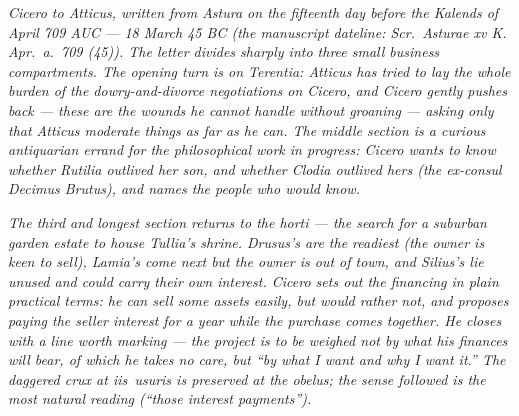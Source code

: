 
\textit{Cicero to Atticus, written from Astura on the
fifteenth day before the Kalends of April 709 AUC ---
18 March 45 BC (the manuscript dateline: \textit{Scr.\
Asturae xv K. Apr.\ a.\ 709 (45)}). The letter divides
sharply into three small business compartments. The
opening turn is on Terentia: Atticus has tried to lay
the whole burden of the dowry-and-divorce negotiations
on Cicero, and Cicero gently pushes back --- these
are the wounds he cannot handle without groaning ---
asking only that Atticus moderate things as far as he
can. The middle section is a curious antiquarian
errand for the philosophical work in progress: Cicero
wants to know whether Rutilia outlived her son, and
whether Clodia outlived hers (the ex-consul Decimus
Brutus), and names the people who would know.}

\textit{The third and longest section returns to the
\textit{horti} --- the search for a suburban garden
estate to house Tullia's shrine. Drusus's are the
readiest (the owner is keen to sell), Lamia's come
next but the owner is out of town, and Silius's lie
unused and could carry their own interest. Cicero
sets out the financing in plain practical terms: he
can sell some assets easily, but would rather not,
and proposes paying the seller interest for a year
while the purchase comes together. He closes with a
line worth marking --- the project is to be weighed
not by what his finances will bear, of which he takes
no care, but ``by what I want and why I want it.''
The daggered crux at \textit{iis\dag\ usuris} is
preserved at the obelus; the sense followed is the
most natural reading (``those interest payments'').}
